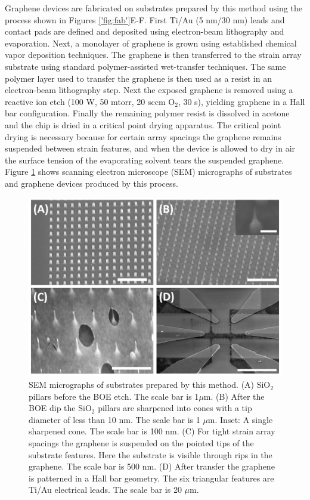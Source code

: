 \documentclass[edeposit,fullpage,draftthesis]{uiucthesis2009}
\begin{document}
            Graphene devices are fabricated on substrates prepared by this method using the process shown in Figures \ref{'fig:fab'}E-F. 
            First Ti/Au (5 nm/30 nm) leads and contact pads are defined and deposited using electron-beam lithography and evaporation. 
            Next, a monolayer of graphene is grown using established chemical vapor deposition techniques\cite{Li2009}. 
            The graphene is then transferred to the strain array substrate using standard polymer-assisted wet-transfer 
            techniques\cite{li2009transfer}. The same polymer layer used to transfer the graphene is then used as a 
            resist in an electron-beam lithography step. Next the exposed graphene is removed using a reactive ion etch 
            (100 W, 50 mtorr, 20 sccm O$_2$, 30 s), yielding graphene in a Hall bar configuration. Finally the remaining 
            polymer resist is dissolved in acetone and the chip is dried in a critical point drying apparatus. 
            The critical point drying is necessary because for certain array spacings the graphene remains suspended between
            strain features, and when the device is allowed to dry in air the surface tension 
            of the evaporating solvent tears the suspended graphene.
            Figure \ref{'fig:sem'} shows scanning electron microscope (SEM) micrographs of substrates and
            graphene devices produced by this process.
            
            \begin{figure}
            \centering
            \includegraphics[width=0.7\columnwidth]{images/resultsanddiscussion/strainarraypaper/Figure2}
            \caption[SEM micrographs of strain array substrates]{SEM micrographs of substrates prepared by this method. 
            (A) SiO$_2$ pillars before the BOE etch. The scale bar is 1$\mu$m.
            (B) After the BOE dip the SiO$_2$ pillars are sharpened into cones with a tip diameter of less than 10 nm.
            The scale bar is 1 $\mu$m. Inset: A single sharpened cone. The scale bar is 100 nm.
            (C) For tight strain array spacings the graphene is suspended on the pointed tips of the substrate features.
            Here the substrate is visible through rips in the graphene. The scale bar is 500 nm.
            (D) After transfer the graphene is patterned in a Hall bar geometry. The six triangular features are Ti/Au
            electrical leads. The scale bar is 20 $\mu$m.}
            \label{'fig:sem'}
            \end{figure}
            
\end{document}
